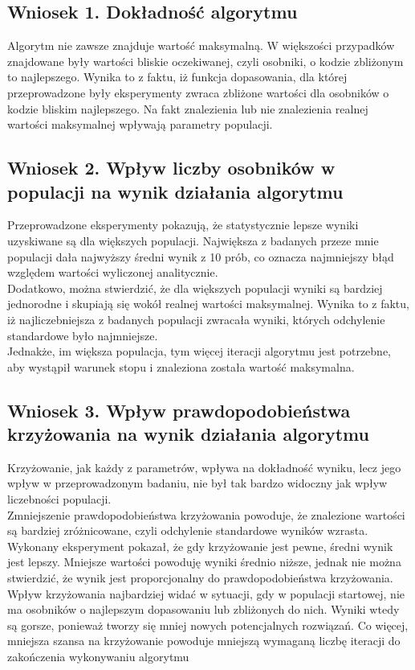 \documentclass[a4paper,11pt]{article}
\begin{document}
		\subsection{Wniosek 1. Dokładność algorytmu}
		Algorytm nie zawsze znajduje wartość maksymalną. W większości przypadków znajdowane były wartości bliskie oczekiwanej, czyli osobniki, o kodzie zbliżonym to najlepszego. Wynika to z faktu, iż funkcja dopasowania, dla której przeprowadzone były eksperymenty zwraca zbliżone wartości dla osobników o kodzie bliskim najlepszego. Na fakt znalezienia lub nie znalezienia realnej wartości maksymalnej wpływają parametry populacji.
		\subsection{Wniosek 2. Wpływ liczby osobników w populacji na wynik działania algorytmu}
		Przeprowadzone eksperymenty pokazują, że statystycznie lepsze wyniki uzyskiwane są dla większych populacji. Największa z badanych przeze mnie populacji dała najwyższy średni wynik z 10 prób, co oznacza najmniejszy błąd względem wartości wyliczonej analitycznie.\\ Dodatkowo, można stwierdzić, że dla większych populacji wyniki są bardziej jednorodne i skupiają się wokół realnej wartości maksymalnej. Wynika to z faktu, iż najliczebniejsza z badanych populacji zwracała wyniki, których odchylenie standardowe było najmniejsze. \\
		Jednakże, im większa populacja, tym więcej iteracji algorytmu jest potrzebne, aby wystąpił warunek stopu i znaleziona została wartość maksymalna.
		\subsection{Wniosek 3. Wpływ prawdopodobieństwa krzyżowania na wynik działania algorytmu}
		Krzyżowanie, jak każdy z parametrów, wpływa na dokładność wyniku, lecz jego wpływ w przeprowadzonym badaniu, nie był tak bardzo widoczny jak wpływ liczebności populacji.\\
		Zmniejszenie prawdopodobieństwa krzyżowania powoduje, że znalezione wartości są bardziej zróżnicowane, czyli odchylenie standardowe wyników wzrasta. \\
		Wykonany eksperyment pokazał, że gdy krzyżowanie jest pewne, średni wynik jest lepszy. Mniejsze wartości powoduję wyniki średnio niższe, jednak nie można stwierdzić, że wynik jest proporcjonalny do prawdopodobieństwa krzyżowania. \\
		Wpływ krzyżowania najbardziej widać w sytuacji, gdy w populacji startowej, nie ma osobników o najlepszym dopasowaniu lub zbliżonych do nich. Wyniki wtedy są gorsze, ponieważ tworzy się mniej nowych potencjalnych rozwiązań. 
		Co więcej, mniejsza szansa na krzyżowanie powoduje mniejszą wymaganą liczbę iteracji do zakończenia wykonywaniu algorytmu
\end{document}
